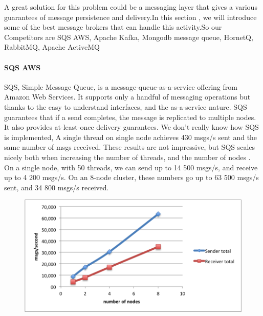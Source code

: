 A great solution for this problem could be a messaging layer that gives a various guarantees 
of message persistence and delivery.In this section , we will introduce some of the best message brokers that can 
handle this activity.So our Competitors are SQS AWS, Apache Kafka, Mongodb message queue, HornetQ, RabbitMQ, 
Apache ActiveMQ

\paragraph{SQS AWS}
\label{sec:sec01}
SQS, Simple Message Queue, is a message-queue-as-a-service offering from Amazon Web Services.
 It supports only a handful of messaging operations but 
 thanks to the easy to understand interfaces, and the as-a-service nature.
SQS guarantees that if a send completes, the message is replicated to multiple nodes.
 It also provides at-least-once delivery guarantees. We don't really know how SQS is implemented,
A single thread on single node achieves 430 msgs/s
 sent and the same number of msgs received.
These results are not impressive, 
but SQS scales nicely both when increasing the number of threads, and the number of nodes
. On a single node, with 50 threads, we can send up to 14 500 msgs/s, and receive up to 4 200 msgs/s.
On an 8-node cluster, these numbers go up to 63 500 msgs/s sent, and 34 800 msgs/s received.
\begin{figure}[h!]
	\centering
	\includegraphics[height=0.2\textheight]{fig01/SQS}
	\label{fig:FilialesEtClients}
\end{figure}
